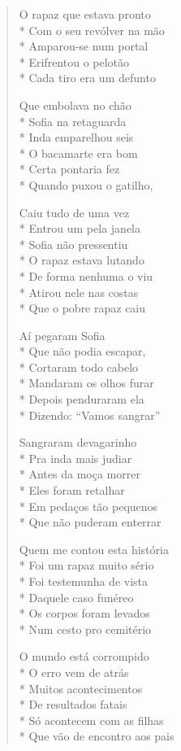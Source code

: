 \begin{verse}
O rapaz que estava pronto\\*
Com o seu revólver na mão\\*
Amparou-se num portal\\*
Erifrentou o pelotão\\*
Cada tiro era um defunto

Que embolava no chão\\*
Sofia na retaguarda\\*
Inda emparelhou seis\\*
O bacamarte era bom\\*
Certa pontaria fez\\*
Quando puxou o gatilho,

Caiu tudo de uma vez\\*
Entrou um pela janela\\*
Sofia não pressentiu\\*
O rapaz estava lutando\\*
De forma nenhuma o viu\\*
Atirou nele nas costas\\*
Que o pobre rapaz caiu

Aí pegaram Sofia\\*
Que não podia escapar,\\*
Cortaram todo cabelo\\*
Mandaram os olhos furar\\*
Depois penduraram ela\\*
Dizendo: ``Vamos sangrar''

Sangraram devagarinho\\*
Pra inda mais judiar\\*
Antes da moça morrer\\*
Eles foram retalhar\\*
Em pedaços tão pequenos\\*
Que não puderam enterrar

Quem me contou esta história\\*
Foi um rapaz muito sério\\*
Foi testemunha de vista\\*
Daquele caso funéreo\\*
Os corpos foram levados\\*
Num cesto pro cemitério

O mundo está corrompido\\*
O erro vem de atrás\\*
Muitos acontecimentos\\*
De resultados fatais\\*
Só acontecem com as filhas\\*
Que vão de encontro aos pais

\end{verse}


